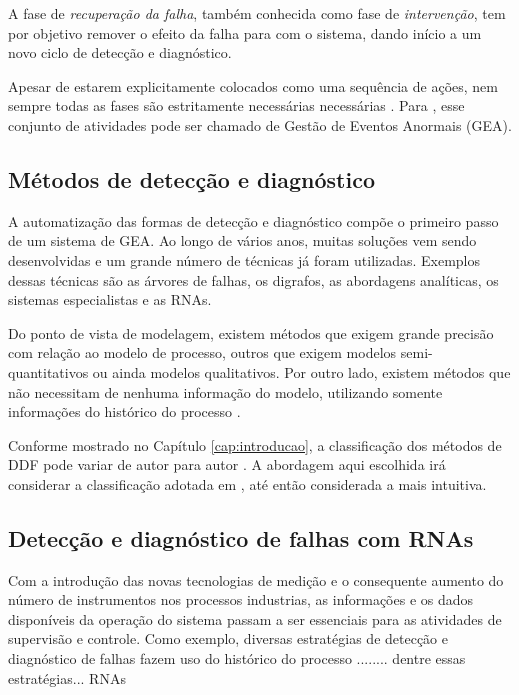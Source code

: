 A fase de {\it recuperação da falha}, também conhecida como fase de {\it
intervenção}, tem por objetivo remover o efeito da falha para com o sistema,
dando início a um novo ciclo de detecção e diagnóstico.

Apesar de estarem explicitamente colocados como uma sequência de ações, nem
sempre todas as fases são estritamente necessárias necessárias
\cite{chiang:2001}. Para , esse conjunto de
atividades pode ser chamado de Gestão de Eventos Anormais (GEA).


\subsection{Métodos de detecção e diagnóstico}
A automatização das formas de detecção e diagnóstico compõe o primeiro passo de
um sistema de GEA. Ao longo de vários anos, muitas soluções vem sendo
desenvolvidas e um grande número de técnicas já foram utilizadas. Exemplos
dessas técnicas são as árvores de falhas, os digrafos, as abordagens analíticas,
os sistemas especialistas e as RNAs.

\fussy
Do ponto de vista de modelagem, existem métodos que exigem grande precisão com
relação ao modelo de processo, outros que exigem modelos semi-quantitativos ou
ainda modelos qualitativos. Por outro lado, existem métodos que não necessitam
de nenhuma informação do modelo, utilizando somente informações do histórico do
processo \cite{venkatasu:2003a}.
\sloppy

Conforme mostrado no Capítulo \ref{cap:introducao}, a classificação dos métodos
de DDF pode variar de autor para autor
\cite{venkatasu:2003a,angeli:2004,zhang:2008,isermann:2006}. A abordagem aqui
escolhida irá considerar a classificação adotada em ,
até então considerada a mais intuitiva.

\subsection{Detecção e diagnóstico de falhas com RNAs}

Com a introdução das novas tecnologias de medição e o consequente aumento do
número de instrumentos nos processos industrias, as informações e os dados
disponíveis da operação do sistema passam a ser essenciais para as atividades de
supervisão e controle. Como exemplo, diversas estratégias de detecção e
diagnóstico de falhas fazem uso do histórico do processo ........ dentre essas
estratégias... RNAs

